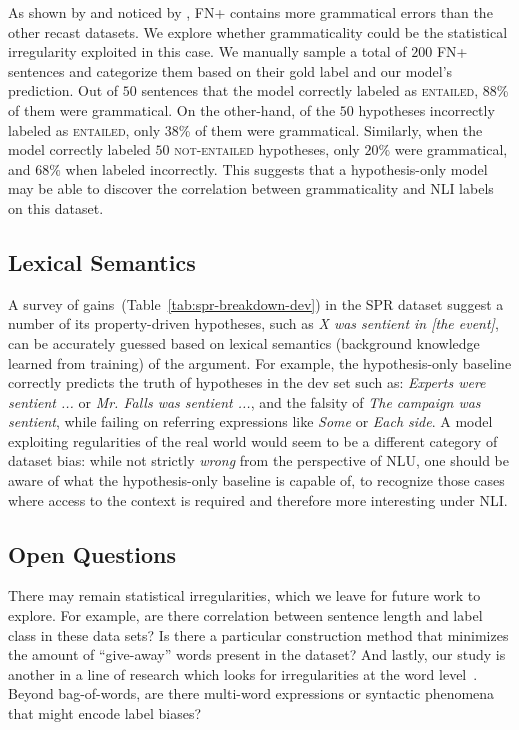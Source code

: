 As shown by  and noticed by , FN+ contains more grammatical errors than the other recast datasets.  We explore whether grammaticality could be the statistical irregularity exploited in this case. We manually sample a total of $200$ FN+ sentences and categorize them based on their gold label and our model's prediction. Out of $50$ sentences that the model correctly labeled as \textsc{entailed}, 88\% of them were grammatical. On the other-hand, of the $50$ hypotheses incorrectly labeled as \textsc{entailed}, only $38$\% of them were grammatical. Similarly, when the model correctly labeled $50$ \textsc{not-entailed}
hypotheses, only $20\%$ were grammatical, and $68\%$ when labeled incorrectly. This suggests that a hypothesis-only model may be able to discover the correlation between grammaticality and NLI labels on this dataset.

\subsection{Lexical Semantics}

A survey of gains~(Table~\ref{tab:spr-breakdown-dev}) in the SPR dataset suggest a number of its property-driven hypotheses, such as \emph{X was sentient in [the event]}, can be accurately guessed based on  lexical semantics (background knowledge learned from training) of the argument.  For example, the hypothesis-only baseline correctly predicts the truth of hypotheses in the dev set such as: \emph{Experts were sentient ...} or \emph{Mr. Falls was sentient ...}, and the falsity of \emph{The campaign was sentient}, while failing on referring expressions like \emph{Some} or \emph{Each side}. A model exploiting regularities of the real world would seem to be a different category of dataset bias: while not strictly \emph{wrong} from the perspective of NLU, one should  be aware of what the hypothesis-only baseline is capable of,  to recognize those cases where access to the context is required and therefore more interesting under NLI.

\subsection{Open Questions}

There may  remain statistical irregularities, which we leave for future work to explore.  For example, are there correlation between sentence length and label class in these data sets?  Is there a particular construction method that minimizes the amount of ``give-away'' words present in the dataset?  And lastly, our study is another in a line of research which looks for irregularities at the word level~\cite{maccartney2008phrase, maccartney2009natural}.  Beyond bag-of-words, are there multi-word expressions or syntactic phenomena that might encode label biases?

